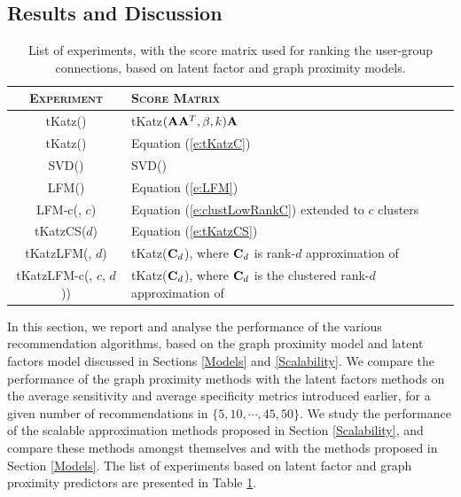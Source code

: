 \subsection{Results and Discussion}
\label{Results and Discussion}
\begin{table}[h!]
\centering
\begin{tabular}{| c | l |} \hline
\textsc{Experiment}&\textsc{Score Matrix}\\ \hline
\textsf{tKatz}(\A) & \textsf{tKatz}$(\mathbf{A}\mathbf{A}^T, \beta, k) \mathbf{A}$ \\ \hline
\textsf{tKatz}(\C) & Equation (\ref{e:tKatzC}) \\ \hline
SVD(\A) & SVD(\A) \\ \hline
LFM(\C) & Equation (\ref{e:LFM}) \\ \hline
LFM-c(\C, $c$) & Equation (\ref{e:clustLowRankC}) extended to $c$ clusters\\ \hline
\textsf{tKatzCS}($d$) & Equation (\ref{e:tKatzCS}) \\ \hline
\textsf{tKatzLFM}(\C, $d$) & \textsf{tKatz}($\mathbf{C}_d$), where $\mathbf{C}_d$ is rank-$d$ approximation of \C \\ \hline
\textsf{tKatzLFM-c}(\C, $c$, $d$)) & \textsf{tKatz}($\mathbf{C}_d$), where $\mathbf{C}_d$ is the clustered rank-$d$ approximation of \C \\ \hline
\end{tabular}
\caption{List of experiments, with the score matrix used for ranking the user-group connections, based on latent factor and graph proximity models.}
\label{tab:experiments}
\end{table}

In this section, we report and analyse the performance of the various recommendation algorithms, based on the graph proximity model and latent factors model discussed in Sections \ref{Models} and \ref{Scalability}. We compare the performance of the graph proximity methods with the latent factors methods on the average sensitivity and average specificity metrics introduced earlier, for a given number of recommendations in $\{ 5,10,\cdots,45, 50\}$.  We study the performance of the scalable approximation methods proposed in Section \ref{Scalability}, and compare these methods amongst themselves and with the methods proposed in Section \ref{Models}. The list of experiments based on latent factor and graph proximity predictors are presented in Table \ref{tab:experiments}.


